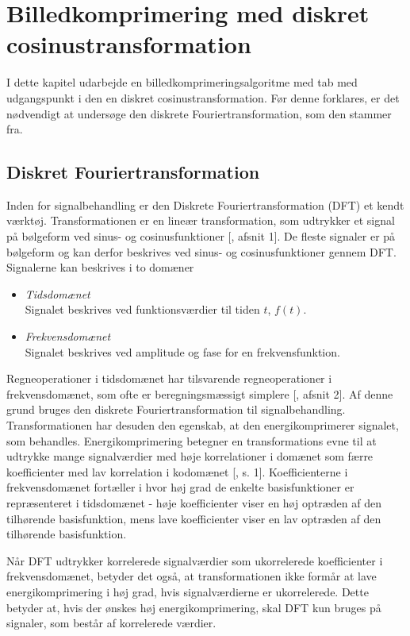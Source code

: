 \chapter{Billedkomprimering med diskret cosinustransformation} \label{chapter:DCT}
I dette kapitel udarbejde en billedkomprimeringsalgoritme med tab med udgangspunkt i den
en diskret cosinustransformation. Før denne forklares, er det nødvendigt at undersøge
den diskrete Fouriertransformation, som den stammer fra.
\section{Diskret Fouriertransformation}
Inden for signalbehandling er den Diskrete Fouriertransformation (DFT) et kendt værktøj. Transformationen er en lineær transformation, som udtrykker et signal på bølgeform ved sinus- og cosinusfunktioner [\citet{thefouriertransform}, afsnit 1]. De fleste signaler er på bølgeform og kan derfor beskrives ved sinus- og cosinusfunktioner gennem DFT.\\
Signalerne kan beskrives i to domæner
\begin{itemize}
\item \textit{Tidsdomænet}\\
		Signalet beskrives ved funktionsværdier til tiden $t$, $f(t)$.
\item \textit{Frekvensdomænet}\\
		Signalet beskrives ved amplitude og fase for en frekvensfunktion.
\end{itemize}
Regneoperationer i tidsdomænet har tilsvarende regneoperationer i frekvensdomænet, som ofte er beregningsmæssigt simplere [\citet{nbtwiki}, afsnit 2]. Af denne grund bruges den diskrete Fouriertransformation til signalbehandling.\\
Transformationen har desuden den egenskab, at den energikomprimerer signalet, som behandles. Energikomprimering betegner en transformations evne til at udtrykke mange signalværdier med høje korrelationer i domænet som færre koefficienter med lav korrelation i kodomænet [\citet{smcnus_energy}, s. 1]. Koefficienterne i frekvensdomænet fortæller i hvor høj grad de enkelte basisfunktioner er repræsenteret i tidsdomænet - høje koefficienter viser en høj optræden af den tilhørende basisfunktion, mens lave koefficienter viser en lav optræden af den tilhørende basisfunktion.

Når DFT udtrykker korrelerede signalværdier som ukorrelerede koefficienter i frekvensdomænet, betyder det også, at transformationen ikke formår at lave energikomprimering i høj grad, hvis signalværdierne er ukorrelerede. Dette betyder at, hvis der ønskes høj energikomprimering, skal DFT kun bruges på signaler, som består af korrelerede værdier.

